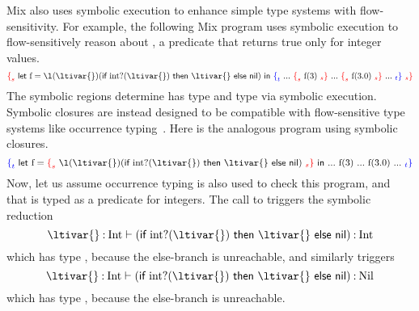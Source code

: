 \documentclass[11pt]{iuthesis}
\begin{document}
Mix also uses symbolic execution to enhance simple type systems with flow-sensitivity.
For example, the following Mix program uses symbolic execution 
to flow-sensitively reason about , a predicate that returns true only for integer values.
%
\[
\MixSregion{\ltilet{\text{f}}{\ltiufun{\ltivar{}}{(\ltiif{\ltiapp{\text{int?}}{\ltivar{}}}{\ltivar{}}{\textsf{nil}})}}
                  {\MixTregion{  ...\ \MixSregion{\ltiapp{\text{f}}{3}}
                               \ ...\ \MixSregion{\ltiapp{\text{f}}{3.0}}
                               \ ... }}}
\]
%
The symbolic regions determine
 has type  and
 type  via symbolic execution.
Symbolic closures are instead designed to be compatible with flow-sensitive type systems like occurrence typing~\cite{TF10}.
Here is the analogous program using symbolic closures.
%
\[
\MixTregion{\ltilet{\text{f}}{\MixSregion{\ltiufun{\ltivar{}}{(\ltiif{\ltiapp{\text{int?}}{\ltivar{}}}{\ltivar{}}{\textsf{nil}})}}}
                  {  ...\ {\ltiapp{\text{f}}{3}}
                               \ ...\ {\ltiapp{\text{f}}{3.0}}
                               \ ... }}
\]
%
Now, let us assume occurrence typing is also used to check this program, and
that  is typed as a predicate for integers.
The call to
{}
triggers the symbolic reduction
%
\[
\ltitjudgementNoElab{\hastype{\ltivar{}}{\text{Int}}}
                    {(\ltiif{\ltiapp{\text{int?}}{\ltivar{}}}{\ltivar{}}{\textsf{nil}})}
                    {\text{Int}}
\]
%
which has type , because the else-branch is unreachable, and 
similarly {} triggers
%
\[
\ltitjudgementNoElab{\hastype{\ltivar{}}{\text{Int}}}
                    {(\ltiif{\ltiapp{\text{int?}}{\ltivar{}}}{\ltivar{}}{\textsf{nil}})}
                    {\text{Nil}}
\]
%
which has type , because the else-branch is unreachable.




\end{document}
